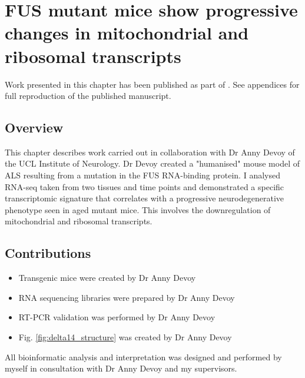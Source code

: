 \chapter{FUS mutant mice show progressive changes in mitochondrial and ribosomal transcripts}

\label{chapter:fus_mouse}

Work presented in this chapter has been published as part of \citep{Devoy2017}. See appendices for full reproduction of the published manuscript.

\section{Overview}
This chapter describes work carried out in collaboration with Dr Anny Devoy of the UCL Institute of Neurology. 
Dr Devoy created a "humanised" mouse model of ALS resulting from a mutation in the FUS RNA-binding protein. 
I analysed RNA-seq taken from two tissues and time points and demonstrated a specific transcriptomic signature that correlates with a progressive neurodegenerative phenotype seen in aged mutant mice.
This involves the downregulation of mitochondrial and ribosomal transcripts.

\section{Contributions}
\begin{itemize}
	\item Transgenic mice were created by Dr Anny Devoy
	\item RNA sequencing libraries were prepared by Dr Anny Devoy
	\item RT-PCR validation was performed by Dr Anny Devoy
	\item Fig. \ref{fig:delta14_structure} was created by Dr Anny Devoy
\end{itemize}
All bioinformatic analysis and interpretation was designed and performed by myself in consultation with Dr Anny Devoy and my supervisors. 


